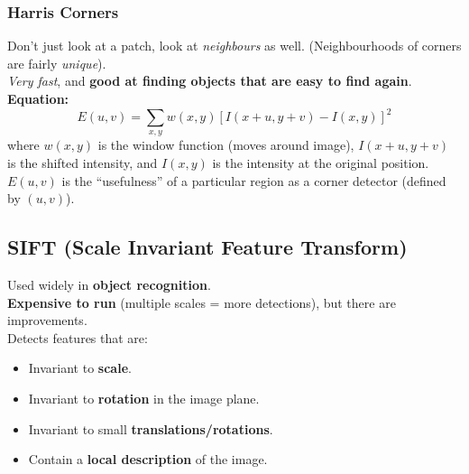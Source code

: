 \documentclass[english, 10pt]{article}
\begin{document}
\subsubsection{Harris Corners}\label{harris-corners}

Don't just look at a patch, look at \emph{neighbours} as well. (Neighbourhoods of corners are fairly \emph{unique}). \\

\emph{Very fast}, and \textbf{good at finding objects that are easy to find again}. \\

\textbf{Equation:} 
$$ E(u, v) = \sum_{x, y} w(x, y)[I(x + u, y + v) - I(x, y)]^2$$
where $w(x, y)$ is the window function (moves around image), $I(x + u, y + v)$ is the shifted intensity, and $I(x, y)$ is the intensity at the original position. \\

$E(u, v)$ is the ``usefulness'' of a particular region as a corner detector (defined by $(u, v)$).

%

\subsection{SIFT (Scale Invariant Feature
Transform)}
  
  Used widely in \textbf{object recognition}. \\
  
  \textbf{Expensive to run} (multiple scales = more detections), but there are improvements. \\
  
Detects features that are:

\begin{itemize}
\item
  Invariant to \textbf{scale}.
\item
  Invariant to \textbf{rotation} in the image plane.
\item
  Invariant to small \textbf{translations/rotations}.
\item
  Contain a \textbf{local description} of the image.
  
\end{itemize}
\end{document}

